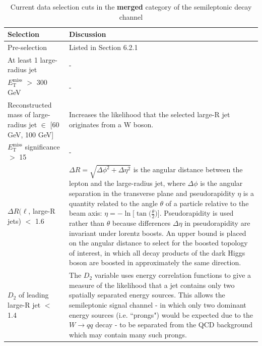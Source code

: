 \documentclass[12pt]{article}
\newcommand*{\met}{\ensuremath{E_\text{T}^\text{miss}} }
\begin{document}
\begin{table}[H]
\centering
\caption{Current data selection cuts in the \textbf{merged} category of the semileptonic decay channel}
\label{tab:merged_cuts}
\begin{footnotesize}
\renewcommand{\arraystretch}{1.5}
\begin{tabular}{|p{50mm}|p{100mm}|}
\hline
\textbf{Selection} & \textbf{Discussion}  \\ \hline
Pre-selection & Listed in Section 6.2.1      \\ \hline
At least 1 large-radius jet & -      \\ \hline
\met $>$ 300 GeV      & -      \\ \hline
Reconstructed mass of large-radius jet $\in$ [60 GeV, 100 GeV]     & Increases the likelihood that the selected large-R jet originates from a W boson.        \\ \hline
\met significance $>$ 15    &  -        \\ \hline
$\Delta R(\ell$, large-R jets) $<$ 1.6    & $\Delta R = \sqrt{\Delta\phi^2+\Delta\eta^2}$ is the angular distance between the lepton and the large-radius jet, where $\Delta\phi$ is the angular separation in the transverse plane and pseudorapidity $\eta$ is a quantity related to the angle $\theta$ of a particle relative to the beam axis: $\eta=-\ln\Big[\tan\Big(\frac{\theta}{2}\Big)\Big]$. Pseudorapidity is used rather than $\theta$ because differences $\Delta\eta$ in pseudorapidity are invariant under lorentz boosts. An upper bound is placed on the angular distance to select for the boosted topology of interest, in which all decay products of the dark Higgs boson are boosted in approximately the same direction.      \\ \hline
$D_{2}$ of leading large-R jet $<$ 1.4   & The $D_{2}$ variable \cite{Marzani_2019} uses energy correlation functions to give a measure of the likelihood that a jet contains only two spatially separated energy sources. This allows the semileptonic signal channel - in which only two dominant energy sources (i.e. ``prongs") would be expected due to the $W\rightarrow qq$ decay - to be separated from the QCD background which may contain many such prongs.     \\ \hline
\end{tabular}
\end{footnotesize}
\end{table}
\end{document}
